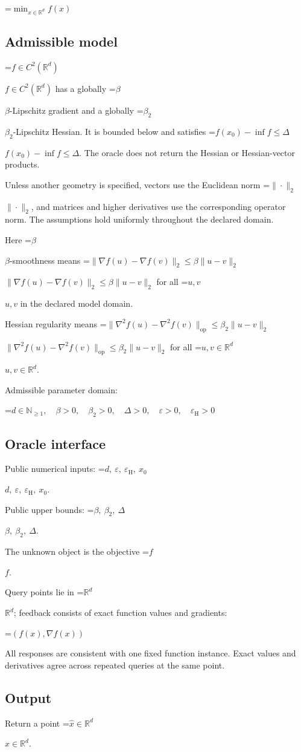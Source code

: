 \documentclass[10pt,a4paper]{article}
\newcommand{\AtlasMath}[1]{\par\begingroup\centering\setbox0=\hbox{$\displaystyle #1$}\ifdim\wd0>1.4\linewidth\typeout{ATLAS WIDE FORMULA: \the\wd0}\fi\ifdim\wd0>\linewidth\resizebox{\linewidth}{!}{\box0}\else\box0\fi\par\endgroup}
\newcommand{\AtlasInlineMath}[1]{\begingroup\setbox0=\hbox{$#1$}\ifdim\wd0>.4\linewidth\endgroup\AtlasMath{#1}\else\endgroup$#1$\fi}
\begin{document}
\AtlasMath{\min_{x\in \mathbb{R}^d}f(x)}


\subsection{Admissible model}
\AtlasInlineMath{f\in C^2(\mathbb R^d)} has a globally \AtlasInlineMath{\beta}-Lipschitz gradient and a globally \AtlasInlineMath{\beta_2}-Lipschitz Hessian. It is bounded below and satisfies \AtlasInlineMath{f(x_0)-\inf f\le\Delta}. The oracle does not return the Hessian or Hessian-vector products.

Unless another geometry is specified, vectors use the Euclidean norm \AtlasInlineMath{\|\cdot\|_2}, and matrices and higher derivatives use the corresponding operator norm. The assumptions hold uniformly throughout the declared domain.

Here \AtlasInlineMath{\beta}-smoothness means \AtlasInlineMath{\|\nabla f(u)-\nabla f(v)\|_2\le\beta\|u-v\|_2} for all \AtlasInlineMath{u,v} in the declared model domain.

Hessian regularity means \AtlasInlineMath{\|\nabla^2 f(u)-\nabla^2 f(v)\|_{\mathrm{op}}\le\beta_2\|u-v\|_2} for all \AtlasInlineMath{u,v\in\mathbb R^d}.

Admissible parameter domain:


\AtlasMath{d\in\mathbb{N}_{\ge1},\quad \beta>0,\quad \beta_2>0,\quad \Delta>0,\quad \varepsilon>0,\quad \varepsilon_{\mathrm{H}}>0}


\subsection{Oracle interface}
Public numerical inputs: \AtlasInlineMath{d,\ \varepsilon,\ \varepsilon_{\mathrm{H}},\ x_0}.

Public upper bounds: \AtlasInlineMath{\beta,\ \beta_2,\ \Delta}.

The unknown object is the objective \AtlasInlineMath{f}.

Query points lie in \AtlasInlineMath{\mathbb{R}^d}; feedback consists of exact function values and gradients:


\AtlasMath{(f(x),\nabla f(x))}


All responses are consistent with one fixed function instance. Exact values and derivatives agree across repeated queries at the same point.

\subsection{Output}
Return a point \AtlasInlineMath{\widehat x\in\mathbb R^d}.
\end{document}
